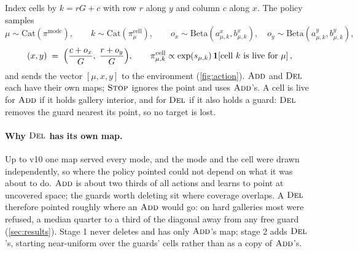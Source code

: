 \documentclass[11pt,a4paper]{article}
\begin{document}
Index cells by $k = rG + c$ with row $r$ along $y$ and column $c$ along $x$. The policy
samples
\[
  \mu \sim \mathrm{Cat}(\pi^{\mathrm{mode}}), \qquad
  k \sim \mathrm{Cat}(\pi^{\mathrm{cell}}_\mu), \qquad
  o_x \sim \mathrm{Beta}(a^x_{\mu,k},b^x_{\mu,k}), \quad o_y \sim \mathrm{Beta}(a^y_{\mu,k},b^y_{\mu,k}),
\]
\[
  (x,y) \;=\; \Bigl(\frac{c + o_x}{G},\; \frac{r + o_y}{G}\Bigr),
  \qquad
  \pi^{\mathrm{cell}}_{\mu,k} \propto \exp(s_{\mu,k})\,\mathbf{1}\!\left[\text{cell $k$ is live for $\mu$}\right],
\]
and sends the vector $[\mu, x, y]$ to the environment (\cref{fig:action}). $\textsc{Add}$ and $\textsc{Del}$
each have their own maps; $\textsc{Stop}$ ignores the point and uses $\textsc{Add}$'s. A cell is live for
$\textsc{Add}$ if it holds gallery interior, and for $\textsc{Del}$ if it also holds a guard: $\textsc{Del}$ removes the
guard nearest its point, so no target is lost.

\paragraph{Why $\textsc{Del}$ has its own map.} Up to v10 one map served every mode, and the mode and
the cell were drawn independently, so where the policy pointed could not depend on what it was
about to do. $\textsc{Add}$ is about two thirds of all actions and learns to point at uncovered space;
the guards worth deleting sit where coverage overlaps. A $\textsc{Del}$ therefore pointed roughly where
an $\textsc{Add}$ would go: on hard galleries most were refused, a median quarter to a third of the
diagonal away from any free guard (\cref{sec:results}). Stage 1 never deletes and has only
$\textsc{Add}$'s map; stage 2 adds $\textsc{Del}$'s, starting near-uniform over the guards' cells rather than
as a copy of $\textsc{Add}$'s.
\end{document}
